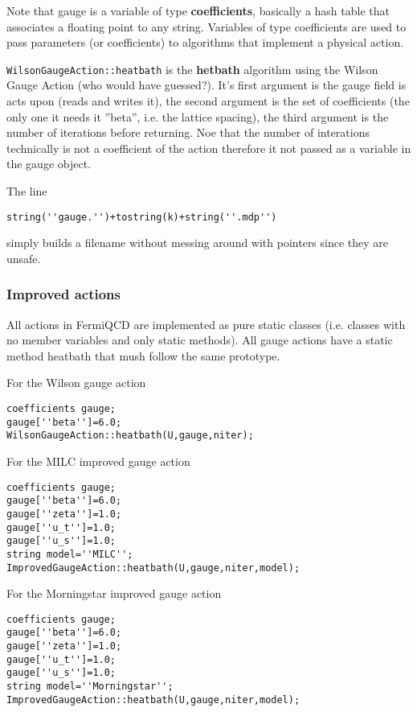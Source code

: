 Note that gauge is a variable of type {\bf coefficients}, basically a hash
table that associates a floating point to any string. Variables of type
coefficients are used to pass parameters (or coefficients) to algorithms
that implement a physical action.

{\tt WilsonGaugeAction::heatbath} is the {\bf hetbath} algorithm using the
Wilson Gauge Action (who would have guessed?). It's first argument is the
gauge field is acts upon (reads and writes it), the second argument is the
set of coefficients (the only one it needs it ''beta'', i.e. the lattice
spacing), the third argument is the number of iterations before returning.
Noe that the number of interations technically is not a coefficient of the
action therefore it not passed as a variable in the gauge object.

The line 
\begin{verbatim}
string(''gauge.'')+tostring(k)+string(''.mdp'')
\end{verbatim}

simply builds a filename without messing around with pointers since they are
unsafe.

\subsubsection{Improved actions}

All actions in FermiQCD are implemented as pure static classes (i.e. classes
with no member variables and only static methods). All gauge actions have a
static method heatbath that mush follow the same prototype.

For the Wilson gauge action
\begin{verbatim}
coefficients gauge;
gauge[''beta'']=6.0;      
WilsonGaugeAction::heatbath(U,gauge,niter);
\end{verbatim}

For the MILC improved gauge action
\begin{verbatim}
coefficients gauge;
gauge[''beta'']=6.0;      
gauge[''zeta'']=1.0;      
gauge[''u_t'']=1.0;      
gauge[''u_s'']=1.0;      
string model=''MILC'';
ImprovedGaugeAction::heatbath(U,gauge,niter,model);
\end{verbatim}

For the Morningstar improved gauge action
\begin{verbatim}
coefficients gauge;
gauge[''beta'']=6.0;      
gauge[''zeta'']=1.0;      
gauge[''u_t'']=1.0;      
gauge[''u_s'']=1.0;      
string model=''Morningstar'';
ImprovedGaugeAction::heatbath(U,gauge,niter,model); 
\end{verbatim}


